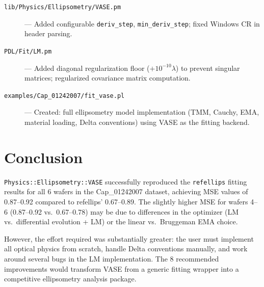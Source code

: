 \documentclass[11pt]{article}
\begin{document}
\begin{description}
\item[\texttt{lib/Physics/Ellipsometry/VASE.pm}] ---
  Added configurable \texttt{deriv\_step}, \texttt{min\_deriv\_step};
  fixed Windows CR in header parsing.
\item[\texttt{PDL/Fit/LM.pm}] --- Added diagonal regularization floor
  ($+10^{-10}\lambda$) to prevent singular matrices; regularized
  covariance matrix computation.
\item[\texttt{examples/Cap\_01242007/fit\_vase.pl}] --- Created:
  full ellipsometry model implementation (TMM, Cauchy, EMA, material
  loading, Delta conventions) using VASE as the fitting backend.
\end{description}

\section{Conclusion}

\texttt{Physics::Ellipsometry::VASE} successfully reproduced the
\texttt{refellips} fitting results for all 6 wafers in the
Cap\_01242007 dataset, achieving MSE values of 0.87--0.92 compared
to refellips' 0.67--0.89. The slightly higher MSE for wafers 4--6
(0.87--0.92 vs.\ 0.67--0.78) may be due to differences in the
optimizer (LM vs.\ differential evolution + LM) or the linear vs.\ 
Bruggeman EMA choice.

However, the effort required was substantially greater: the user
must implement all optical physics from scratch, handle Delta
conventions manually, and work around several bugs in the LM
implementation. The 8 recommended improvements would transform
VASE from a generic fitting wrapper into a competitive ellipsometry
analysis package.
\end{document}
